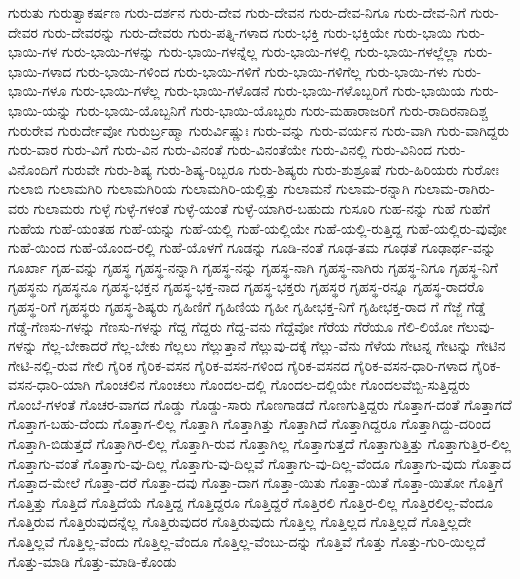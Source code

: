 {ಗುರುತು
ಗುರುತ್ವಾಕರ್ಷಣ
ಗುರು-ದರ್ಶನ
ಗುರು-ದೇವ
ಗುರು-ದೇವನ
ಗುರು-ದೇವ-ನಿಗೂ
ಗುರು-ದೇವ-ನಿಗೆ
ಗುರು-ದೇವರ
ಗುರು-ದೇವರನ್ನು
ಗುರು-ದೇವರು
ಗುರು-ಪತ್ನಿ-ಗಳಾದ
ಗುರು-ಭಕ್ತಿ
ಗುರು-ಭಕ್ತಿಯೇ
ಗುರು-ಭಾಯಿ
ಗುರು-ಭಾಯಿ-ಗಳ
ಗುರು-ಭಾಯಿ-ಗಳನ್ನು
ಗುರು-ಭಾಯಿ-ಗಳನ್ನೆಲ್ಲ
ಗುರು-ಭಾಯಿ-ಗಳಲ್ಲಿ
ಗುರು-ಭಾಯಿ-ಗಳಲ್ಲೆಲ್ಲಾ
ಗುರು-ಭಾಯಿ-ಗಳಾದ
ಗುರು-ಭಾಯಿ-ಗಳಿಂದ
ಗುರು-ಭಾಯಿ-ಗಳಿಗೆ
ಗುರು-ಭಾಯಿ-ಗಳಿಗೆಲ್ಲ
ಗುರು-ಭಾಯಿ-ಗಳು
ಗುರು-ಭಾಯಿ-ಗಳೂ
ಗುರು-ಭಾಯಿ-ಗಳೆಲ್ಲ
ಗುರು-ಭಾಯಿ-ಗಳೊಡನೆ
ಗುರು-ಭಾಯಿ-ಗಳೊಬ್ಬರಿಗೆ
ಗುರು-ಭಾಯಿಯ
ಗುರು-ಭಾಯಿ-ಯನ್ನು
ಗುರು-ಭಾಯಿ-ಯೊಬ್ಬನಿಗೆ
ಗುರು-ಭಾಯಿ-ಯೊಬ್ಬರು
ಗುರು-ಮಹಾರಾಜರಿಗೆ
ಗುರು-ರಾದಿರನಾದಿಶ್ಚ
ಗುರುರೇವ
ಗುರುರ್ದೇವೋ
ಗುರುರ್ಬ್ರಹ್ಮಾ
ಗುರುರ್ವಿಷ್ಣುಃ
ಗುರು-ವನ್ನು
ಗುರು-ವರ್ಯನ
ಗುರು-ವಾಗಿ
ಗುರು-ವಾಗಿದ್ದರು
ಗುರು-ವಾರ
ಗುರು-ವಿಗೆ
ಗುರು-ವಿನ
ಗುರು-ವಿನಂತೆ
ಗುರು-ವಿನಂತೆಯೇ
ಗುರು-ವಿನಲ್ಲಿ
ಗುರು-ವಿನಿಂದ
ಗುರು-ವಿನೊಂದಿಗೆ
ಗುರುವೇ
ಗುರು-ಶಿಷ್ಯ
ಗುರು-ಶಿಷ್ಯ-ರಿಬ್ಬರೂ
ಗುರು-ಶಿಷ್ಯರು
ಗುರು-ಶುಶ್ರೂಷೆ
ಗುರು-ಹಿರಿಯರು
ಗುರೋಃ
ಗುಲಾಬಿ
ಗುಲಾಮಗಿರಿ
ಗುಲಾಮಗಿರಿಯ
ಗುಲಾಮಗಿರಿ-ಯಲ್ಲಿತ್ತು
ಗುಲಾಮನೆ
ಗುಲಾಮ-ರನ್ನಾಗಿ
ಗುಲಾಮ-ರಾಗಿರು-ವರು
ಗುಲಾಮರು
ಗುಳ್ಳೆ
ಗುಳ್ಳೆ-ಗಳಂತೆ
ಗುಳ್ಳೆ-ಯಂತೆ
ಗುಳ್ಳೆ-ಯಾಗಿರ-ಬಹುದು
ಗುಸೂರಿ
ಗುಹ-ನನ್ನು
ಗುಹೆ
ಗುಹೆಗೆ
ಗುಹೆಯ
ಗುಹೆ-ಯಂತಹ
ಗುಹೆ-ಯನ್ನು
ಗುಹೆ-ಯಲ್ಲಿ
ಗುಹೆ-ಯಲ್ಲಿಯೇ
ಗುಹೆ-ಯಲ್ಲಿ-ರುತ್ತಿದ್ದ
ಗುಹೆ-ಯಲ್ಲಿರು-ವುವೋ
ಗುಹೆ-ಯಿಂದ
ಗುಹೆ-ಯೊಂದ-ರಲ್ಲಿ
ಗುಹೆ-ಯೊಳಗೆ
ಗೂಡನ್ನು
ಗೂಡಿ-ನಂತೆ
ಗೂಢ-ತಮ
ಗೂಢತೆ
ಗೂಢಾರ್ಥ-ವನ್ನು
ಗೂರ್ಖಾ
ಗೃಹ-ವನ್ನು
ಗೃಹಸ್ಥ
ಗೃಹಸ್ಥ-ನನ್ನಾಗಿ
ಗೃಹಸ್ಥ-ನನ್ನು
ಗೃಹಸ್ಥ-ನಾಗಿ
ಗೃಹಸ್ಥ-ನಾಗಿರು
ಗೃಹಸ್ಥ-ನಿಗೂ
ಗೃಹಸ್ಥ-ನಿಗೆ
ಗೃಹಸ್ಥನು
ಗೃಹಸ್ಥನೂ
ಗೃಹಸ್ಥ-ಭಕ್ತನ
ಗೃಹಸ್ಥ-ಭಕ್ತ-ನಾದ
ಗೃಹಸ್ಥ-ಭಕ್ತರು
ಗೃಹಸ್ಥರ
ಗೃಹಸ್ಥ-ರನ್ನೂ
ಗೃಹಸ್ಥ-ರಾದರೊ
ಗೃಹಸ್ಥ-ರಿಗೆ
ಗೃಹಸ್ಥರು
ಗೃಹಸ್ಥ-ಶಿಷ್ಯರು
ಗೃಹಿಣಿಗೆ
ಗೃಹಿಣಿಯ
ಗೃಹೀ
ಗೃಹೀಭಕ್ತ-ನಿಗೆ
ಗೃಹೀಭಕ್ತ-ರಾದ
ಗೆ
ಗೆಜ್ಜೆ
ಗೆಡ್ಡೆ
ಗೆಡ್ಡೆ-ಗೆಣಸು-ಗಳನ್ನು
ಗೆಣಸು-ಗಳನ್ನು
ಗೆದ್ದ
ಗೆದ್ದರು
ಗೆದ್ದ-ವನು
ಗೆದ್ದೆವೋ
ಗೆರೆಯ
ಗೆರೆಯೂ
ಗೆಲಿ-ಲಿಯೋ
ಗೆಲುವು-ಗಳನ್ನು
ಗೆಲ್ಲ-ಬೇಕಾದರೆ
ಗೆಲ್ಲ-ಬೇಕು
ಗೆಲ್ಲಲು
ಗೆಲ್ಲುತ್ತಾನೆ
ಗೆಲ್ಲುವು-ದಕ್ಕೆ
ಗೆಲ್ಲು-ವೆನು
ಗೆಳೆಯ
ಗೇಟನ್ನ
ಗೇಟನ್ನು
ಗೇಟಿನ
ಗೇಟಿ-ನಲ್ಲಿ-ರುವ
ಗೇಲಿ
ಗೈರಿಕ
ಗೈರಿಕ-ವಸನ
ಗೈರಿಕ-ವಸನ-ಗಳಿಂದ
ಗೈರಿಕ-ವಸನದ
ಗೈರಿಕ-ವಸನ-ಧಾರಿ-ಗಳಾದ
ಗೈರಿಕ-ವಸನ-ಧಾರಿ-ಯಾಗಿ
ಗೊಂಚಲಿನ
ಗೊಂಚಲು
ಗೊಂದಲ-ದಲ್ಲಿ
ಗೊಂದಲ-ದಲ್ಲಿಯೇ
ಗೊಂದಲವೆಬ್ಬಿ-ಸುತ್ತಿದ್ದರು
ಗೊಂಬೆ-ಗಳಂತೆ
ಗೊಚರ-ವಾಗದ
ಗೊಡ್ಡು
ಗೊಡ್ಡು-ಸಾರು
ಗೊಣಗಾಡದೆ
ಗೊಣಗುತ್ತಿದ್ದರು
ಗೊತ್ತಾಗ-ದಂತೆ
ಗೊತ್ತಾಗದೆ
ಗೊತ್ತಾಗ-ಬಹು-ದೆಂದು
ಗೊತ್ತಾಗ-ಲಿಲ್ಲ
ಗೊತ್ತಾಗಿ
ಗೊತ್ತಾಗಿತ್ತು
ಗೊತ್ತಾಗಿದೆ
ಗೊತ್ತಾಗಿದ್ದರೂ
ಗೊತ್ತಾಗಿದ್ದು-ದರಿಂದ
ಗೊತ್ತಾಗಿ-ಬಿಡುತ್ತದೆ
ಗೊತ್ತಾಗಿರ-ಲಿಲ್ಲ
ಗೊತ್ತಾಗಿ-ರುವ
ಗೊತ್ತಾಗಿಲ್ಲ
ಗೊತ್ತಾಗುತ್ತದೆ
ಗೊತ್ತಾಗುತ್ತಿತ್ತು
ಗೊತ್ತಾಗುತ್ತಿರ-ಲಿಲ್ಲ
ಗೊತ್ತಾಗು-ವಂತೆ
ಗೊತ್ತಾಗು-ವು-ದಿಲ್ಲ
ಗೊತ್ತಾಗು-ವು-ದಿಲ್ಲವೆ
ಗೊತ್ತಾಗು-ವು-ದಿಲ್ಲ-ವೆಂದೂ
ಗೊತ್ತಾಗು-ವುದು
ಗೊತ್ತಾದ
ಗೊತ್ತಾದ-ಮೇಲೆ
ಗೊತ್ತಾ-ದರೆ
ಗೊತ್ತಾ-ದವು
ಗೊತ್ತಾ-ದಾಗ
ಗೊತ್ತಾ-ಯಿತು
ಗೊತ್ತಾ-ಯಿತೆ
ಗೊತ್ತಾ-ಯಿತೋ
ಗೊತ್ತಿಗೆ
ಗೊತ್ತಿತ್ತು
ಗೊತ್ತಿದೆ
ಗೊತ್ತಿದೆಯೆ
ಗೊತ್ತಿದ್ದ
ಗೊತ್ತಿದ್ದರೂ
ಗೊತ್ತಿದ್ದರೆ
ಗೊತ್ತಿರಲಿ
ಗೊತ್ತಿರ-ಲಿಲ್ಲ
ಗೊತ್ತಿರಲಿಲ್ಲ-ವೆಂದೂ
ಗೊತ್ತಿರುವ
ಗೊತ್ತಿರುವುದನ್ನೆಲ್ಲ
ಗೊತ್ತಿರುವುದರ
ಗೊತ್ತಿರುವುದು
ಗೊತ್ತಿಲ್ಲ
ಗೊತ್ತಿಲ್ಲದ
ಗೊತ್ತಿಲ್ಲದೆ
ಗೊತ್ತಿಲ್ಲದೇ
ಗೊತ್ತಿಲ್ಲವೆ
ಗೊತ್ತಿಲ್ಲ-ವೆಂದು
ಗೊತ್ತಿಲ್ಲ-ವೆಂದೂ
ಗೊತ್ತಿಲ್ಲ-ವೆಂಬು-ದನ್ನು
ಗೊತ್ತಿವೆ
ಗೊತ್ತು
ಗೊತ್ತು-ಗುರಿ-ಯಿಲ್ಲದೆ
ಗೊತ್ತು-ಮಾಡಿ
ಗೊತ್ತು-ಮಾಡಿ-ಕೊಂಡು
}
